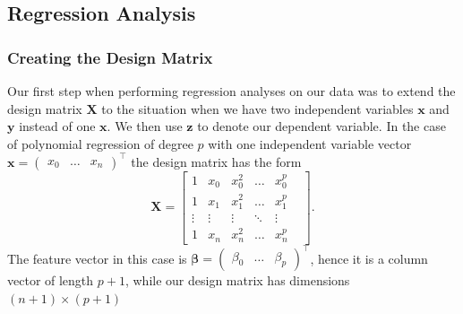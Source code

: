 \documentclass[aps,pra,english,notitlepage,reprint,nofootinbib]{revtex4-1}  %
\begin{document}
\subsection{Regression Analysis}
\subsubsection{Creating the Design Matrix}
Our first step when performing regression analyses on our data was to extend the design matrix $\mathbf{X}$ to the situation when we have two independent variables $\mathbf{x}$ and $\mathbf{y}$ instead of one $\mathbf{x}$. We then use $\mathbf{z}$ to denote our dependent variable. In the case of polynomial regression of degree $p$ with one independent variable vector $\mathbf{x}=\begin{pmatrix} x_0 &\ldots&x_{n}\end{pmatrix}^\top$ the design matrix has the form
\begin{equation*}
  \mathbf{X} = \begin{bmatrix}
    1 & x_0 & x_0^2 & \ldots & x_0^p
    \\
    1 & x_1 & x_1^2 & \ldots & x_1^p
    \\
    \vdots&\vdots&\vdots&\ddots&\vdots&
    \\
    1 & x_{n} & x_{n}^2 & \ldots&x_{n}^p
  \end{bmatrix}.
\end{equation*}
The feature vector in this case is $\boldsymbol{\beta}=\begin{pmatrix} \beta_0 &\ldots&\beta_{p}\end{pmatrix}^\top$, hence it is a column vector of length $p+1$, while our design matrix has dimensions $(n+1)\times (p+1)$
\end{document}

